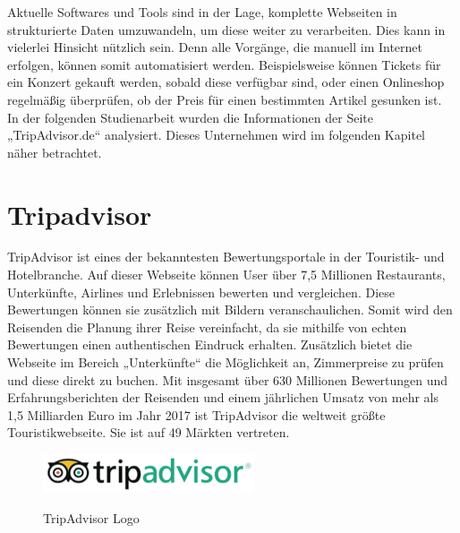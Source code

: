 \documentclass[a4paper,oneside,12pt]{report}
\begin{document}
				Aktuelle Softwares und Tools sind in der Lage, komplette Webseiten in strukturierte Daten umzuwandeln, um diese weiter zu verarbeiten. Dies kann in vielerlei Hinsicht nützlich sein. Denn alle Vorgänge, die manuell im Internet erfolgen, können somit automatisiert werden. Beispielsweise können Tickets für ein Konzert gekauft werden, sobald diese verfügbar sind, oder einen Onlineshop regelmäßig überprüfen, ob der Preis für einen bestimmten Artikel gesunken ist. \cite{bib-scrapehero}
				\\				
				In der folgenden Studienarbeit wurden die Informationen der Seite „TripAdvisor.de“ analysiert. Dieses Unternehmen wird im folgenden Kapitel näher betrachtet.
			
				
		\section{Tripadvisor}
	
			TripAdvisor ist eines der bekanntesten Bewertungsportale in der Touristik- und Hotelbranche.
			Auf dieser Webseite können User über 7,5 Millionen Restaurants, Unterkünfte, Airlines und Erlebnissen bewerten und vergleichen. Diese Bewertungen können sie zusätzlich mit Bildern veranschaulichen. Somit wird den Reisenden die Planung ihrer Reise vereinfacht, da sie mithilfe von echten Bewertungen einen authentischen Eindruck erhalten. 
			Zusätzlich bietet die Webseite im Bereich „Unterkünfte“ die Möglichkeit an, Zimmerpreise zu prüfen und diese direkt zu buchen. Mit insgesamt über 630 Millionen Bewertungen und Erfahrungsberichten der Reisenden und einem jährlichen Umsatz von mehr als 1,5 Milliarden Euro im Jahr 2017 \cite{bib-statista} ist TripAdvisor die weltweit größte Touristikwebseite. Sie ist auf 49 Märkten vertreten. \cite{bib-taMedia}
			
			\begin{figure}[H]
				\centering
				\begin{minipage}[b]{0.4\textwidth}
					\includegraphics[width=\textwidth]{Bilder/LogoTripadvisor.png}
				\end{minipage}
				\centering
				\caption[TripAdvisor Logo]{TripAdvisor Logo} \cite{bib-tripadvisorLogo}
				\label{pic-taLogo}
			\end{figure}
			
\end{document}
